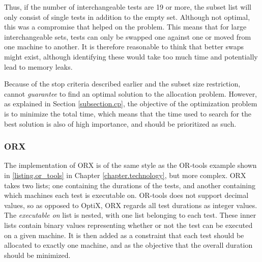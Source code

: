 Thus, if the number of interchangeable tests are 19 or more, the subset list will only consist of single tests in addition to the empty set. Although not optimal, this was a compromise that helped on the problem. This means that for large interchangeable sets, tests can only be swapped one against one or moved from one machine to another. It is therefore reasonable to think that better swaps might exist, although identifying these would take too much time and potentially lead to memory leaks. 

Because of the stop criteria described earlier and the subset size restriction, \toolname \space cannot \emph{guarantee} to find an optimal solution to the allocation problem. However, as explained in Section \ref{subsection.cp}, the objective of the optimization problem is to minimize the total time, which means that the time used to search for the best solution is also of high importance, and should be prioritized as such.

\subsubsection{ORX}

The implementation of ORX is of the same style as the OR-tools example shown in \lstlistingname \space \ref{listing.or_tools} in Chapter \ref{chapter.technology}, but more complex. ORX takes two lists; one containing the durations of the tests, and another containing which machines each test is executable on. OR-tools does not support decimal values, so as opposed to OptiX, ORX regards all test durations as integer values. The \emph{executable on} list is nested, with one list belonging to each test. These inner lists contain binary values representing whether or not the test can be executed on a given machine. It is then added as a constraint that each test should be allocated to exactly one machine, and as the objective that the overall duration should be minimized.

